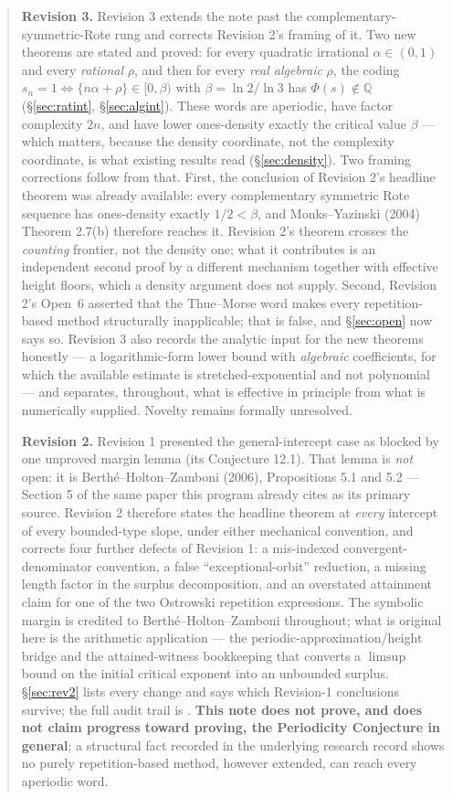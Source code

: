 \documentclass[11pt]{article}
\newcommand{\Q}{\mathbb{Q}}
\begin{document}
\begin{abstract}
\smallskip
\noindent\textbf{Revision 3.} Revision 3 extends the note past the complementary-symmetric-Rote
rung and corrects Revision 2's framing of it. Two new theorems are stated and proved: for every
quadratic irrational $\alpha\in(0,1)$ and every \emph{rational} $\rho$, and then for every
\emph{real algebraic} $\rho$, the coding $s_n=1\iff\{n\alpha+\rho\}\in[0,\beta)$ with
$\beta=\ln2/\ln3$ has $\Phi(s)\notin\Q$ (\S\ref{sec:ratint}, \S\ref{sec:algint}). These words are
aperiodic, have factor complexity $2n$, and have lower ones-density exactly the critical value
$\beta$ --- which matters, because the density coordinate, not the complexity coordinate, is what
existing results read (\S\ref{sec:density}). Two framing corrections follow from that. First, the
conclusion of Revision 2's headline theorem was already available: every complementary symmetric
Rote sequence has ones-density exactly $1/2<\beta$, and Monks--Yazinski (2004) Theorem 2.7(b)
therefore reaches it. Revision 2's theorem crosses the \emph{counting} frontier, not the density
one; what it contributes is an independent second proof by a different mechanism together with
effective height floors, which a density argument does not supply. Second, Revision 2's
Open~6 asserted that the Thue--Morse word makes every repetition-based method structurally
inapplicable; that is false, and \S\ref{sec:open} now says so. Revision 3 also records the analytic
input for the new theorems honestly --- a logarithmic-form lower bound with \emph{algebraic}
coefficients, for which the available estimate is stretched-exponential and not polynomial --- and
separates, throughout, what is effective in principle from what is numerically supplied. Novelty
remains formally unresolved.

\smallskip
\noindent\textbf{Revision 2.} Revision 1 presented the general-intercept case as blocked by one unproved margin lemma (its Conjecture 12.1). That lemma is \emph{not} open: it is Berth\'e--Holton--Zamboni (2006), Propositions 5.1 and 5.2 --- Section 5 of the same paper this program already cites as its primary source. Revision 2 therefore states the headline theorem at \emph{every} intercept of every bounded-type slope, under either mechanical convention, and corrects four further defects of Revision 1: a mis-indexed convergent-denominator convention, a false ``exceptional-orbit'' reduction, a missing length factor in the surplus decomposition, and an overstated attainment claim for one of the two Ostrowski repetition expressions. The symbolic margin is credited to Berth\'e--Holton--Zamboni throughout; what is original here is the arithmetic application --- the periodic-approximation/height bridge and the attained-witness bookkeeping that converts a $\limsup$ bound on the initial critical exponent into an unbounded surplus. \S\ref{sec:rev2} lists every change and says which Revision-1 conclusions survive; the full audit trail is \cite{Phase8Target,Phase8Verdict}. \textbf{This note does not prove, and does not claim progress toward proving, the Periodicity Conjecture in general}; a structural fact recorded in the underlying research record shows no purely repetition-based method, however extended, can reach every aperiodic word.
\end{abstract}
\end{document}
